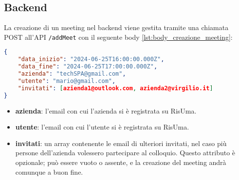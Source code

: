 \subsection{Backend}
La creazione di un meeting nel backend viene gestita tramite una chiamata POST all'API \texttt{\//addMeet} con il seguente body
\ref{lst:body_creazione_meeting}:
\begin{lstlisting}[language=json, caption={body creazione meeting}, label={lst:body_creazione_meeting}]
{
    "data_inizio": "2024-06-25T16:00:00.000Z", 
    "data_fine": "2024-06-25T17:00:00.000Z",   
    "azienda": "techSPA@gmail.com", 
    "utente": "mario@gmail.com",
    "invitati": [azienda1@outlook.com, azienda2@virgilio.it]
}
\end{lstlisting}
\begin{itemize}
    \item \textbf{azienda}: l'email con cui l'azienda si è registrata su RisUma.
    \item \textbf{utente}: l'email con cui l'utente si è registrata su RisUma.
    \item \textbf{invitati}: un array contenente le email di ulteriori invitati, nel caso più persone dell'azienda volessero 
    partecipare al colloquio. Questo attributo è opzionale; può essere vuoto o assente, e la creazione del meeting andrà comunque a buon fine.
\end{itemize}


